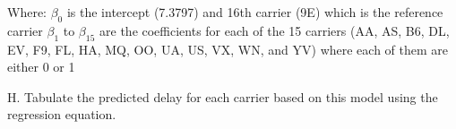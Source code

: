 \documentclass[
]{article}
\newenvironment{Shaded}{\begin{snugshade}}{\end{snugshade}}
\newcommand{\CommentTok}[1]{\textcolor[rgb]{0.56,0.35,0.01}{\textit{#1}}}
\newcommand{\DecValTok}[1]{\textcolor[rgb]{0.00,0.00,0.81}{#1}}
\newcommand{\FunctionTok}[1]{\textcolor[rgb]{0.00,0.00,0.00}{#1}}
\newcommand{\NormalTok}[1]{#1}
\newcommand{\OtherTok}[1]{\textcolor[rgb]{0.56,0.35,0.01}{#1}}
\newcommand{\SpecialCharTok}[1]{\textcolor[rgb]{0.00,0.00,0.00}{#1}}
\newcommand{\StringTok}[1]{\textcolor[rgb]{0.31,0.60,0.02}{#1}}
\begin{document}
Where: \(\beta_{0}\) is the intercept (7.3797) and 16th carrier (9E)
which is the reference carrier \(\beta_{1}\) to \(\beta_{15}\) are the
coefficients for each of the 15 carriers (AA, AS, B6, DL, EV, F9, FL,
HA, MQ, OO, UA, US, VX, WN, and YV) where each of them are either 0 or 1

H. Tabulate the predicted delay for each carrier based on this model
using the regression equation.

\begin{Shaded}
\end{Shaded}
\end{document}
